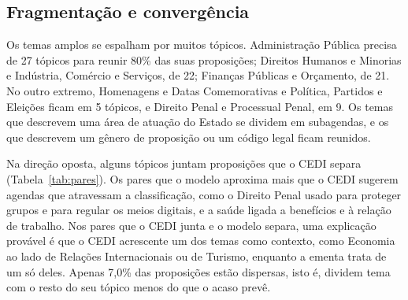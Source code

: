\subsection{Fragmentação e convergência}
\label{subsec:res-frag}

Os temas amplos se espalham por muitos tópicos. Administração Pública precisa de 27 tópicos para reunir 80\% das suas proposições; Direitos Humanos e Minorias e Indústria, Comércio e Serviços, de 22; Finanças Públicas e Orçamento, de 21. No outro extremo, Homenagens e Datas Comemorativas e Política, Partidos e Eleições ficam em 5 tópicos, e Direito Penal e Processual Penal, em 9. Os temas que descrevem uma área de atuação do Estado se dividem em subagendas, e os que descrevem um gênero de proposição ou um código legal ficam reunidos.

Na direção oposta, alguns tópicos juntam proposições que o CEDI separa (Tabela~\ref{tab:pares}). Os pares que o modelo aproxima mais que o CEDI sugerem agendas que atravessam a classificação, como o Direito Penal usado para proteger grupos e para regular os meios digitais, e a saúde ligada a benefícios e à relação de trabalho. Nos pares que o CEDI junta e o modelo separa, uma explicação provável é que o CEDI acrescente um dos temas como contexto, como Economia ao lado de Relações Internacionais ou de Turismo, enquanto a ementa trata de um só deles. Apenas 7,0\% das proposições estão dispersas, isto é, dividem tema com o resto do seu tópico menos do que o acaso prevê.

